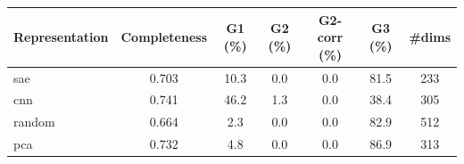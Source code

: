 \begin{tabular}{lcccccc}
\toprule
Representation & Completeness & G1 (\%) & G2 (\%) & G2-corr (\%) & G3 (\%) & \#dims \\
\midrule
sae & 0.703 & 10.3 & 0.0 & 0.0 & 81.5 & 233 \\
cnn & 0.741 & 46.2 & 1.3 & 0.0 & 38.4 & 305 \\
random & 0.664 & 2.3 & 0.0 & 0.0 & 82.9 & 512 \\
pca & 0.732 & 4.8 & 0.0 & 0.0 & 86.9 & 313 \\
\bottomrule
\end{tabular}